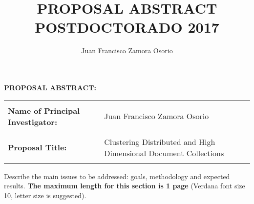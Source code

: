 \documentclass[10pt]{article}
\author{Juan Francisco Zamora Osorio}
\title{PROPOSAL ABSTRACT POSTDOCTORADO 2017}
\begin{document}
\noindent \textbf{PROPOSAL ABSTRACT: }

\noindent \textbf{}

\begin{tabular}{|p{2.3in}|p{4.7in}|}
\hline
\parbox{2.3in}{\centering }
& \parbox{4.7in} {\centering }  \\

\parbox{2.3in} {\raggedright \textbf{Name of Principal Investigator:} }
& \parbox{4.7in} {\centering }  Juan Francisco Zamora Osorio\\ 

\parbox{2.3in}{\centering }
& \parbox{4.7in} {\centering }  \\
\hline 
\parbox{2.3in}{\centering }
& \parbox{4.7in} {\centering }  \\
\parbox{2.3in} {\raggedright\textbf{Proposal Title:} }
& \parbox{4.7in} {\centering }  Clustering  Distributed and High Dimensional Document Collections\\
\parbox{2.3in}{\centering }
& \parbox{4.7in} {\centering }  \\
\hline 
\end{tabular}

\vspace{15pt}
\noindent Describe the main issues to be addressed: goals, methodology and expected results. \textbf{The maximum length for this section is 1 page }(Verdana font size 10, letter size is suggested).
\vspace{10pt}

\end{document}
